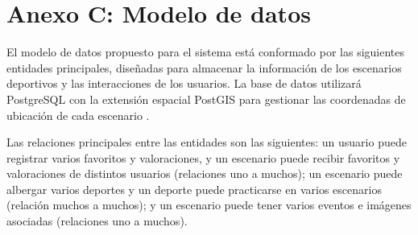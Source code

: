 
\section{Anexo C: Modelo de datos}

El modelo de datos propuesto para el sistema est\'a conformado por las
siguientes entidades principales, dise\~nadas para almacenar la informaci\'on de
los escenarios deportivos y las interacciones de los usuarios. La base de
datos utilizar\'a PostgreSQL con la extensi\'on espacial PostGIS para gestionar
las coordenadas de ubicaci\'on de cada escenario \citep{postgresql}.

\begin{table}[H]
  \centering
  \caption{Entidades del modelo de datos}
\end{table}

Las relaciones principales entre las entidades son las siguientes: un usuario
puede registrar varios favoritos y valoraciones, y un escenario puede recibir
favoritos y valoraciones de distintos usuarios (relaciones uno a muchos); un
escenario puede albergar varios deportes y un deporte puede practicarse en
varios escenarios (relaci\'on muchos a muchos); y un escenario puede tener
varios eventos e im\'agenes asociadas (relaciones uno a muchos).
